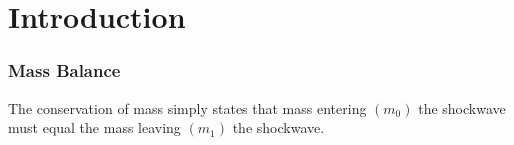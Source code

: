 


\lipsum[6]

\section{Introduction}
\subsubsection{Mass Balance}
The conservation of mass simply states that mass entering $(m_0)$ the shockwave must equal the mass leaving $(m_1)$ the shockwave.

